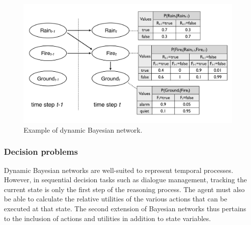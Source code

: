 \begin{figure}[h]
\centering
\includegraphics[scale=0.25]{imgs/dbn.pdf}
\caption{Example of dynamic Bayesian network. }
\label{fig:dbn}
\end{figure}



\subsubsection*{Decision problems}

Dynamic Bayesian networks are well-suited to represent temporal processes.  However, in sequential decision tasks such as dialogue management, tracking the current state is only the first step of the reasoning process. The agent must also be able to calculate the relative utilities of the various actions that can be executed at that  state. The second extension of Bayesian networks thus pertains to the inclusion of actions and utilities in addition to state variables.  

